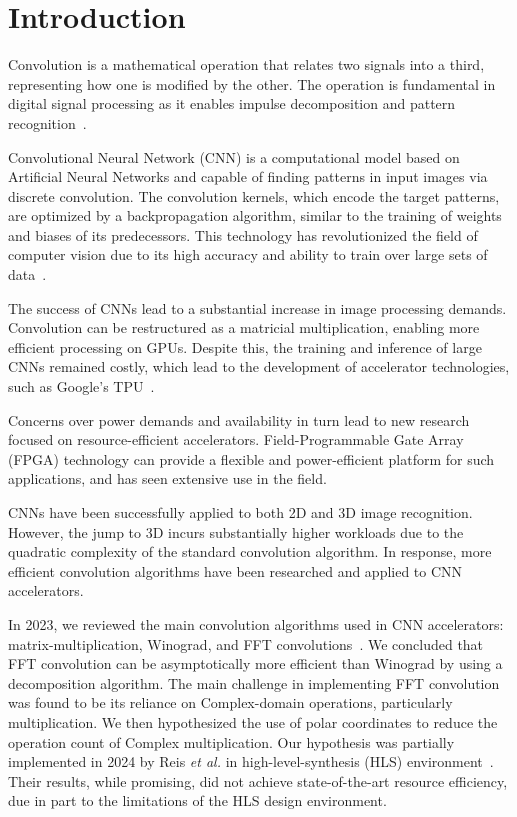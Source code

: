 \chapter{Introduction}\label{ch:int}
Convolution is a mathematical operation that relates two signals into a third, representing how one is modified by the other. The operation is fundamental in digital signal processing as it enables impulse decomposition and pattern recognition~\cite{smith1997scientist}.

Convolutional Neural Network (CNN) is a computational model based on Artificial Neural Networks and capable of finding patterns in input images via discrete convolution. The convolution kernels, which encode the target patterns, are optimized by a backpropagation algorithm, similar to the training of weights and biases of its predecessors. This technology has revolutionized the field of computer vision due to its high accuracy and ability to train over large sets of data~\cite{alzubaidi2021review}.

The success of CNNs lead to a substantial increase in image processing demands. Convolution can be restructured as a matricial multiplication, enabling more efficient processing on GPUs. Despite this, the training and inference of large CNNs remained costly, which lead to the development of accelerator technologies, such as Google's TPU~\cite{jouppi2020domain}.

Concerns over power demands and availability in turn lead to new research focused on resource-efficient accelerators. Field-Programmable Gate Array (FPGA) technology can provide a flexible and power-efficient platform for such applications, and has seen extensive use in the field.

CNNs have been successfully applied to both 2D and 3D image recognition. However, the jump to 3D incurs substantially higher workloads due to the quadratic complexity of the standard convolution algorithm. In response, more efficient convolution algorithms have been researched and applied to CNN accelerators.

In 2023, we reviewed the main convolution algorithms used in CNN accelerators: matrix-multiplication, Winograd, and FFT convolutions~\cite{lera2023hardware}. We concluded that FFT convolution can be asymptotically more efficient than Winograd by using a decomposition algorithm. The main challenge in implementing FFT convolution was found to be its reliance on Complex-domain operations, particularly multiplication. We then hypothesized the use of polar coordinates to reduce the operation count of Complex multiplication. Our hypothesis was partially implemented in 2024 by Reis \textit{et al.} in high-level-synthesis (HLS) environment~\cite{reis2024phasor}. Their results, while promising, did not achieve state-of-the-art resource efficiency, due in part to the limitations of the HLS design environment.

